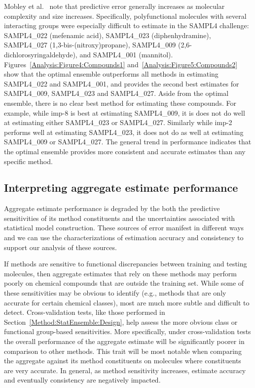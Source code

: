 \documentclass[journal=jpcbfk, manuscript=article]{achemso}
\newcommand{\+}[1]{\ensuremath{\mathbf{#1}}}
\begin{document}
Mobley et al.~\cite{Mobley:2014} note that predictive error generally increases as molecular complexity and size increases. 
Specifically, polyfunctional molecules with several interacting groups were especially difficult to estimate in the SAMPL4 challenge: SAMPL4\_022 (mefenamic acid), SAMPL4\_023 (diphenhydramine), SAMPL4\_027 (1,3-bis-(nitroxy)propane), SAMPL4\_009 (2,6-dichlorosyringaldehyde), and SAMPL4\_001 (mannitol). 
Figures~\ref{Analysis:Figure4:Compounds1} and~\ref{Analysis:Figure5:Compounds2} show that the optimal ensemble outperforms all methods in estimating SAMPL4\_022 and SAMPL4\_001, and provides the second best estimates for SAMPL4\_009, SAMPL4\_023 and SAMPL4\_027.
Aside from the optimal ensemble, there is no clear best method for estimating these compounds.
For example, while imp-8 is best at estimating SAMPL4\_009, it is does not do well at estimating either SAMPL4\_023 or SAMPL4\_027.
Similarly while imp-2 performs well at estimating SAMPL4\_023, it does not do as well at estimating SAMPL4\_009 or SAMPL4\_027.
The general trend in performance indicates that the optimal ensemble provides more consistent and accurate estimates than any specific method. 


\subsection{Interpreting aggregate estimate performance}
Aggregate estimate performance is degraded by the both the predictive sensitivities of its method constituents and the uncertainties associated with statistical model construction.
These sources of error manifest in different ways and we can use the characterizations of estimation accuracy and consistency to support our analysis of these sources.

If methods are sensitive to functional discrepancies between training and testing molecules, then aggregate estimates that rely on these methods may perform poorly on chemical  compounds that are outside the training set. 
While some of these sensitivities may be obvious to identify (e.g., methods that are only accurate for certain chemical classes), most are much more subtle and difficult to detect. 
Cross-validation tests, like those performed in Section~\ref{Method:StatEnsemble:Design}, help assess the more obvious class or functional group-based sensitivities.
More specifically, under cross-validation tests the overall performance of the aggregate estimate will be significantly poorer in comparison to other methods. 
This trait will be most notable when comparing the aggregate against its method constituents on molecules where constituents are very accurate.
In general, as method sensitivity increases, estimate accuracy and eventually consistency are negatively impacted.
\end{document}
